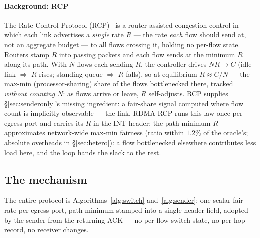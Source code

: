 \documentclass[sigconf, nonacm]{acmart}
\newcommand{\hpccfs}{\textsc{RDMA-RCP}\xspace}
\begin{document}
\paragraph{Background: RCP} The Rate Control Protocol (RCP)~\cite{dukkipati2006fct,dukkipati2008rcp} is a
router-assisted congestion control in which each link advertises a \emph{single} rate $R$
--- the rate \emph{each} flow should send at, not an aggregate budget --- to all flows
crossing it, holding no per-flow state. Routers stamp $R$ into passing packets and each flow
sends at the minimum $R$ along its path. With $N$ flows each
sending $R$, the controller drives $N R \to C$ (idle link $\Rightarrow$ $R$ rises; standing
queue $\Rightarrow$ $R$ falls), so at equilibrium $R \approx C/N$ --- the max-min
(processor-sharing) share of the flows bottlenecked there, tracked \emph{without counting $N$}:
as flows arrive or leave, $R$ self-adjusts. RCP supplies \S\ref{sec:senderonly}'s missing
ingredient: a fair-share signal computed where flow count is implicitly observable --- the
link. \hpccfs runs this law once per egress port and carries its $R$ in the INT header; the
path-minimum $R$ approximates network-wide max-min fairness (ratio within $1.2\%$ of the
oracle's; absolute overheads in \S\ref{sec:hetero}): a flow bottlenecked elsewhere
contributes less load here, and the loop hands the slack to the rest.

\subsection{The mechanism}

The entire protocol is Algorithms~\ref{alg:switch} and~\ref{alg:sender}: one scalar fair
rate per egress port, path-minimum stamped into a single header field, adopted by the sender
from the returning ACK --- no per-flow switch state, no per-hop record, no receiver
changes.
\end{document}
